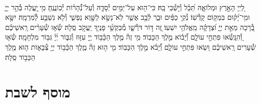 \documentclass[twoside, openany, parskip=half, 11pt]{book}
\begin{document}
\begin{sometimes}

\\
%
לַ֭יְיָ הָאָ֣רֶץ וּמְלוֹאָ֑הּ תֵּ֝בֵ֗ל וְ֯י֣שְׁ֯בֵי בָֽהּ׃
כִּי־ה֖וּא עַל־יַמִּ֣ים יְ֯סָדָ֑הּ וְ֯עַל־נְ֝֯הָר֗וֹת יְ֯כֽוֹנֲנֶֽהָ׃
מִ֥י ֖יַֽעֲלֶה בְּ֯הַ֣ר יְיָ֑ וּמִ֥י־יָ֝ק֗וּם בִּמְק֥וֹם קָדְ֯שֽׁוֹ׃
נְ֯קִ֥י כַפַּ֗יִם וּבַ֢ר לֵ֫בָ֥ב אֲשֶׁ֤ר לֹֽא־נָשָׂ֣א לַשָּׁ֣וְא נַפְשִׁ֑י וְ֯לֹ֖א נִשְׁבַּ֣ע לְ֯מִרְמָֽה׃
יִשָּׂ֣א בְ֭֯רָכָה מֵאֵ֣ת יְיָ֑ וּ֝צְדָקָ֗ה מֵֽאֱלֹהֵ֥י יִשְׁעֽוֹ׃
זֶ֭ה דּ֣וֹר דֹּרְ֯שָׁ֑ו מְ֯בַקְשֵׁ֥֨י פָנֶי֖ךָ יַֽעֲקֹ֣ב סֶֽלָה׃
שְׂ֯א֤וּ שְׁ֯עָרִ֨ים רָֽאשֵׁיכֶ֗ם וְ֭֯הִנָּֽשְׂ֯אוּ פִּתְחֵ֣י עוֹלָ֑ם וְ֝֯יָב֗וֹא מֶ֣לֶךְ הַכָּבֽוֹד׃
מִ֥י זֶה֘ מֶ֤לֶךְ הַכָּ֫ב֥וֹד יְ֖יָ עִזּ֣וּז וְ֯גִבּ֑וֹר יְ֜יָ֗ גִּבּ֥וֹר מִלְחָמָֽה׃
שְׂ֯א֤וּ שְׁ֯עָרִים רָֽאשֵׁיכֶ֗ם וּ֭שְׂאוּ פִּתְחֵ֣י עוֹלָ֑ם וְ֝֯יָבֹ֗א מֶ֣לֶךְ הַכָּבֽוֹד׃
מִ֤י ה֣וּא זֶה֘ מֶ֢לֶךְ הַכָּ֫ב֥וֹד יְיָ֥ צְ֯בָא֑וֹת ה֤וּא מֶ֖לֶךְ הַכָּב֣וֹד סֶֽלָה׃

\end{sometimes}



\etzchaim

\halfkaddish


\vspace{\baselineskip}


{\let\clearpage\relax
\chapter[מוסף לשבת ויו״ט]{ מוסף לשבת }}

\amidaopening{\shabbosshuva}{}

\end{document}
